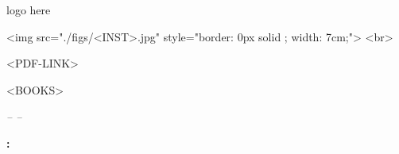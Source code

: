\pagestyle{empty}

\begin{center}
    \vspace{3cm}
    \begin{latexonly}
        logo here %
    \end{latexonly}
    \begin{htmlonly}
		\begin{rawhtml}
			<img src="./figs/<INST>.jpg" style="border: 0px solid ; width: 7cm;"> <br>
		\end{rawhtml}
	\end{htmlonly}
    
    \begin{huge}
        \underlogotext
    \end{huge}
    \latexhtml{\vspace{3cm}}{}

    \begin{huge}
        \doctitle
    \end{huge}
    \latexhtml{\vspace{3cm}}{}

	\begin{htmlonly}
		\begin{rawhtml}
        <PDF-LINK>

        <BOOKS>
		\end{rawhtml}
	\end{htmlonly}

    \begin{Large}
        \textit{-- \FinalReport --}
    \end{Large}
    \latexhtml{\vspace{4cm}}{}

    \begin{Large}
        \textbf{\LastModification: \fecha}
    \end{Large}
\end{center}

